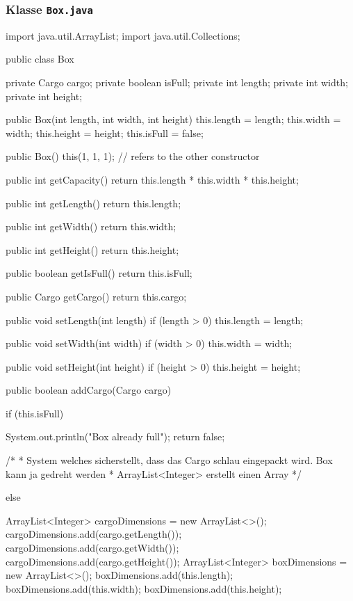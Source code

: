 \documentclass[a4paper,10pt, dvipsnames]{report}
\begin{document}
\subsubsection{Klasse \texttt{Box.java}}

\begin{javacodebox}
import java.util.ArrayList;
import java.util.Collections;


public class Box {
    
    private Cargo cargo;
    private boolean isFull;
    private int length;
    private int width;
    private int height;

    public Box(int length, int width, int height) {
        this.length = length;
        this.width = width;
        this.height = height;
        this.isFull = false;
    }

    public Box() {
        this(1, 1, 1); // refers to the other constructor
    }

    public int getCapacity() {
        return this.length * this.width * this.height;
    }

    public int getLength() {
        return this.length;
    }

    public int getWidth() {
        return this.width;
    }   

    public int getHeight() {
        return this.height;
    }

    public boolean getIsFull() {
        return this.isFull;
    }

    public Cargo getCargo() {
        return this.cargo;
    }

    public void setLength(int length) {
        if (length > 0) {
            this.length = length;
        }
    }

    public void setWidth(int width) {
        if (width > 0) {
            this.width = width;
        }
    }

    public void setHeight(int height) {
        if (height > 0) {
            this.height = height;
        }
    }

    public boolean addCargo(Cargo cargo) {
        if (this.isFull) {
            System.out.println("Box already full");
            return false;

        /*
         * System welches sicherstellt, dass das Cargo schlau eingepackt wird. Box kann ja gedreht werden
         * ArrayList<Integer> erstellt einen Array
         */
        } else { 
            ArrayList<Integer> cargoDimensions = new ArrayList<>();
                cargoDimensions.add(cargo.getLength());
                cargoDimensions.add(cargo.getWidth());
                cargoDimensions.add(cargo.getHeight());
            ArrayList<Integer> boxDimensions = new ArrayList<>();
                boxDimensions.add(this.length);
                boxDimensions.add(this.width);
                boxDimensions.add(this.height);

}}}
\end{javacodebox}
\end{document}
